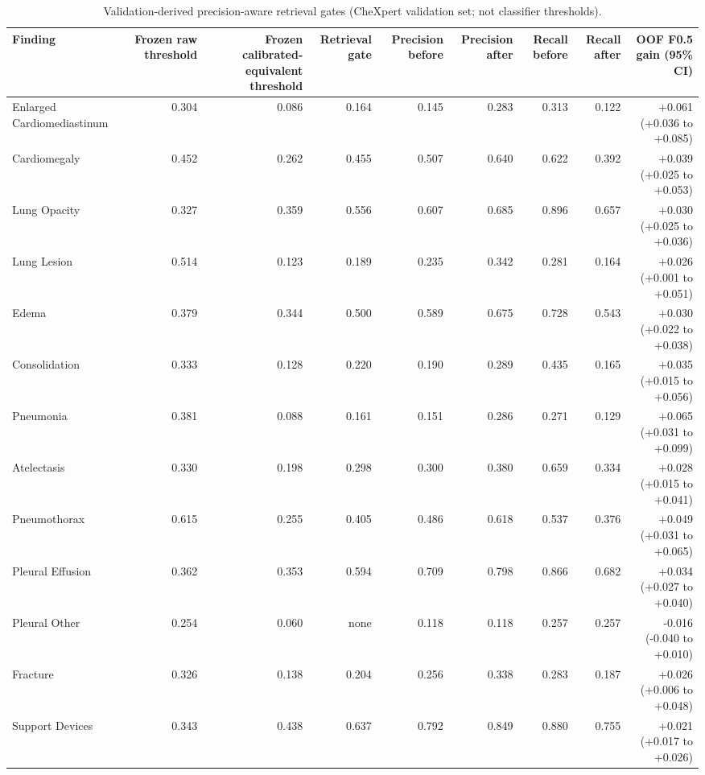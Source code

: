 \begin{table}[t]
\centering
\scriptsize
\begin{tabular}{lrrrrrrrr}
\hline
Finding & Frozen raw threshold & Frozen calibrated-equivalent threshold & Retrieval gate & Precision before & Precision after & Recall before & Recall after & OOF F0.5 gain (95\% CI) \\
\hline
Enlarged Cardiomediastinum & 0.304 & 0.086 & 0.164 & 0.145 & 0.283 & 0.313 & 0.122 & +0.061 (+0.036 to +0.085) \\
Cardiomegaly & 0.452 & 0.262 & 0.455 & 0.507 & 0.640 & 0.622 & 0.392 & +0.039 (+0.025 to +0.053) \\
Lung Opacity & 0.327 & 0.359 & 0.556 & 0.607 & 0.685 & 0.896 & 0.657 & +0.030 (+0.025 to +0.036) \\
Lung Lesion & 0.514 & 0.123 & 0.189 & 0.235 & 0.342 & 0.281 & 0.164 & +0.026 (+0.001 to +0.051) \\
Edema & 0.379 & 0.344 & 0.500 & 0.589 & 0.675 & 0.728 & 0.543 & +0.030 (+0.022 to +0.038) \\
Consolidation & 0.333 & 0.128 & 0.220 & 0.190 & 0.289 & 0.435 & 0.165 & +0.035 (+0.015 to +0.056) \\
Pneumonia & 0.381 & 0.088 & 0.161 & 0.151 & 0.286 & 0.271 & 0.129 & +0.065 (+0.031 to +0.099) \\
Atelectasis & 0.330 & 0.198 & 0.298 & 0.300 & 0.380 & 0.659 & 0.334 & +0.028 (+0.015 to +0.041) \\
Pneumothorax & 0.615 & 0.255 & 0.405 & 0.486 & 0.618 & 0.537 & 0.376 & +0.049 (+0.031 to +0.065) \\
Pleural Effusion & 0.362 & 0.353 & 0.594 & 0.709 & 0.798 & 0.866 & 0.682 & +0.034 (+0.027 to +0.040) \\
Pleural Other & 0.254 & 0.060 & none & 0.118 & 0.118 & 0.257 & 0.257 & -0.016 (-0.040 to +0.010) \\
Fracture & 0.326 & 0.138 & 0.204 & 0.256 & 0.338 & 0.283 & 0.187 & +0.026 (+0.006 to +0.048) \\
Support Devices & 0.343 & 0.438 & 0.637 & 0.792 & 0.849 & 0.880 & 0.755 & +0.021 (+0.017 to +0.026) \\
\hline
\end{tabular}
\caption{Validation-derived precision-aware retrieval gates (CheXpert validation set; not classifier thresholds).}
\label{tab:table6_precision_aware_gates}
\end{table}
